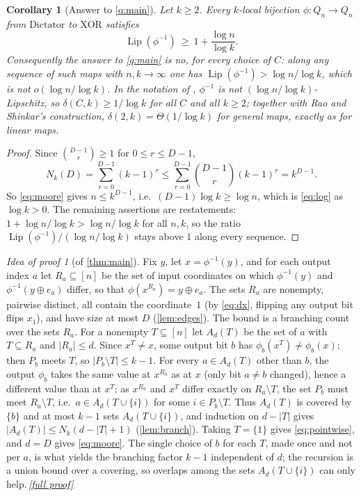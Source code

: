 \documentclass[11pt,a4paper]{article}
\theoremstyle{plain}
\newtheorem{corollary}[theorem]{Corollary}
\theoremstyle{definition}
\theoremstyle{remark}
\newtheorem*{proofidea}{Idea of proof}
\newcommand{\fullproofref}[1]{\,\hyperref[#1]{\textit{[full proof]}}}
\newcommand{\Lip}{\operatorname{Lip}}
\newcommand{\Dict}{\mathrm{Dictator}}
\newcommand{\XOR}{\mathrm{XOR}}
\begin{document}
\begin{corollary}[Answer to \cref{q:main}]\label{cor:question}
Let $k\ge2$. Every $k$-local bijection $\phi\colon Q_n\to Q_n$ from $\Dict$ to $\XOR$ satisfies
\begin{equation}\label{eq:log}
\Lip(\phi^{-1})\ \ge\ 1+\frac{\log n}{\log k}.
\end{equation}
Consequently the answer to \cref{q:main} is \emph{no}, for every choice of $C$: along any sequence of such maps with $n,k\to\infty$ one has $\Lip(\phi^{-1})>\log n/\log k$, which is not $o(\log n/\log k)$. In the notation of \cite{JS21}, $\phi^{-1}$ is not $(\log n/\log k)$-Lipschitz, so $\delta(C,k)\ge1/\log k$ for all $C$ and all $k\ge2$; together with Rao and Shinkar's construction, $\delta(2,k)=\Theta(1/\log k)$ for general maps, exactly as for linear maps.
\end{corollary}
\begin{proof}
Since $\binom{D-1}{r}\ge1$ for $0\le r\le D-1$,
\[
N_k(D)=\sum_{r=0}^{D-1}(k-1)^r\le\sum_{r=0}^{D-1}\binom{D-1}{r}(k-1)^r=k^{D-1}.
\]
So \eqref{eq:moore} gives $n\le k^{D-1}$, i.e.\ $(D-1)\log k\ge\log n$, which is \eqref{eq:log} as $\log k>0$. The remaining assertions are restatements: $1+\log n/\log k>\log n/\log k$ for all $n,k$, so the ratio $\Lip(\phi^{-1})/(\log n/\log k)$ stays above $1$ along every sequence.
\end{proof}

\begin{proofidea}[of \cref{thm:main}]
Fix $y$, let $x=\phi^{-1}(y)$, and for each output index $a$ let $R_a\subseteq[n]$ be the set of input coordinates on which $\phi^{-1}(y)$ and $\phi^{-1}(y\oplus e_a)$ differ, so that $\phi(x^{R_a})=y\oplus e_a$. The sets $R_a$ are nonempty, pairwise distinct, all contain the coordinate~$1$ (by \eqref{eq:dx}, flipping any output bit flips $x_1$), and have size at most $D$ (\cref{lem:edges}). The bound is a branching count over the sets $R_a$. For a nonempty $T\subseteq[n]$ let $A_d(T)$ be the set of $a$ with $T\subseteq R_a$ and $|R_a|\le d$. Since $x^T\ne x$, some output bit $b$ has $\phi_b(x^T)\ne\phi_b(x)$; then $P_b$ meets $T$, so $|P_b\setminus T|\le k-1$. For every $a\in A_d(T)$ other than $b$, the output $\phi_b$ takes the same value at $x^{R_a}$ as at $x$ (only bit $a\neq b$ changed), hence a different value than at $x^T$; as $x^{R_a}$ and $x^T$ differ exactly on $R_a\setminus T$, the set $P_b$ must meet $R_a\setminus T$, i.e.\ $a\in A_d(T\cup\{i\})$ for some $i\in P_b\setminus T$. Thus $A_d(T)$ is covered by $\{b\}$ and at most $k-1$ sets $A_d(T\cup\{i\})$, and induction on $d-|T|$ gives $|A_d(T)|\le N_k(d-|T|+1)$ (\cref{lem:branch}). Taking $T=\{1\}$ gives \eqref{eq:pointwise}, and $d=D$ gives \eqref{eq:moore}. The single choice of $b$ for each $T$, made once and not per $a$, is what yields the branching factor $k-1$ independent of $d$; the recursion is a union bound over a covering, so overlaps among the sets $A_d(T\cup\{i\})$ can only help.\fullproofref{pf:main}
\end{proofidea}
\end{document}
